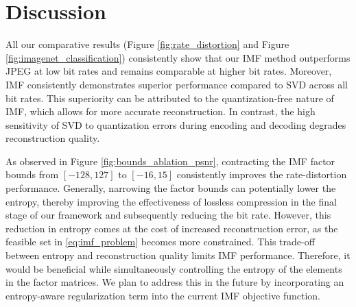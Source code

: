 \section{Discussion} \label{sec:discussion}

All our comparative results (Figure \ref{fig:rate_distortion} and Figure \ref{fig:imagenet_classification}) consistently show that our IMF method outperforms JPEG  at low bit rates and remains comparable at higher bit rates. Moreover, IMF consistently demonstrates superior performance compared to SVD across all bit rates. This superiority can be attributed to the quantization-free nature of IMF, which allows for more accurate reconstruction. In contrast, the high sensitivity of SVD to quantization errors during encoding and decoding degrades reconstruction quality.


As observed in Figure \ref{fig:bounds_ablation_psnr}, contracting the IMF factor bounds from $[-128, 127]$ to $[-16, 15]$ consistently improves the rate-distortion performance. Generally, narrowing the factor bounds can potentially lower the entropy, thereby improving the effectiveness of lossless compression in the final stage of our framework and subsequently reducing the bit rate. However, this reduction in entropy comes at the cost of increased reconstruction error, as the feasible set in \eqref{eq:imf_problem} becomes more constrained. This trade-off between entropy and reconstruction quality limits IMF performance. Therefore, it would be beneficial  while simultaneously controlling the entropy of the elements in the factor matrices. We plan to address this in the future by incorporating an entropy-aware regularization term into the current IMF objective function.


